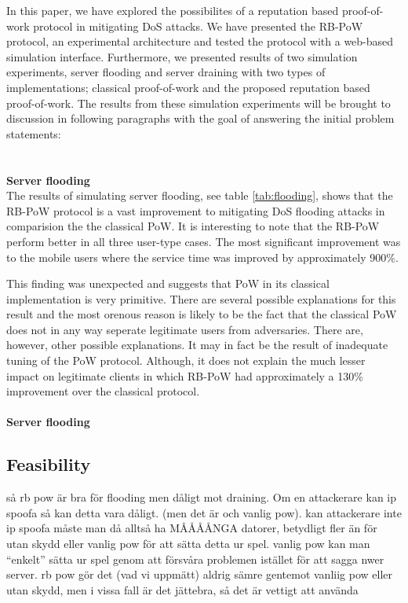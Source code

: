 In this paper, we have explored the possibilites of a reputation based proof-of-work protocol in mitigating DoS attacks. We have presented the RB-PoW protocol, an experimental architecture and tested the protocol with a web-based simulation interface. Furthermore, we presented results of two simulation experiments, server flooding and server draining with two types of implementations; classical proof-of-work and the proposed reputation based proof-of-work. The results from these simulation experiments will be brought to discussion in following paragraphs with the goal of answering the initial problem statements:
\\
\\
\\
\textbf{Server flooding}
\vspace{7pt}
\\
The results of simulating server flooding, see table \ref{tab:flooding}, shows that the RB-PoW protocol is a vast improvement to mitigating DoS flooding attacks in comparision the the classical PoW. It is interesting to note that the RB-PoW perform better in all three user-type cases. The most significant improvement was to the mobile users where the service time was improved by approximately 900\%. 

This finding was unexpected and suggests that PoW in its classical implementation is very primitive.
There are several possible explanations for this result and the most orenous reason is likely to be the fact that the classical PoW does not in any way seperate legitimate users from adversaries.
There are, however, other possible explanations. It may in fact be the result of inadequate tuning of the PoW protocol. Although, it does not explain the much lesser impact on legitimate clients in which RB-PoW had approximately a 130\% improvement over the classical protocol.
\\
\\
\textbf{Server flooding}
\vspace{7pt}
\\



\subsection{Feasibility}
så rb pow är bra för flooding men dåligt mot draining. Om en attackerare kan ip spoofa så kan detta vara dåligt. (men det är och vanlig pow). kan attackerare inte ip spoofa måste man då alltså ha MÅÅÅÅNGA datorer, betydligt fler än för utan skydd eller vanlig pow för att sätta detta ur spel. vanlig pow kan man ``enkelt'' sätta ur spel genom att försvåra problemen istället för att sagga nwer server. rb pow gör det (vad vi uppmätt) aldrig sämre gentemot vanliig pow eller utan skydd, men i vissa fall är det jättebra, så det är vettigt att använda

